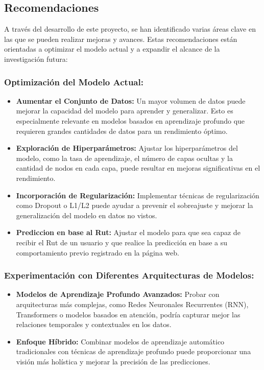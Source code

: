 \subsection{Recomendaciones}

A través del desarrollo de este proyecto, se han identificado varias áreas clave en las que se pueden realizar mejoras y avances. Estas recomendaciones están orientadas a optimizar el modelo actual y a expandir el alcance de la investigación futura:

\subsubsection{Optimización del Modelo Actual:}
\begin{itemize}
    \item \textbf{Aumentar el Conjunto de Datos:} Un mayor volumen de datos puede mejorar la capacidad del modelo para aprender y generalizar. Esto es especialmente relevante en modelos basados en aprendizaje profundo que requieren grandes cantidades de datos para un rendimiento óptimo.
    \item \textbf{Exploración de Hiperparámetros:} Ajustar los hiperparámetros del modelo, como la tasa de aprendizaje, el número de capas ocultas y la cantidad de nodos en cada capa, puede resultar en mejoras significativas en el rendimiento.
    \item \textbf{Incorporación de Regularización:} Implementar técnicas de regularización como Dropout o L1/L2 puede ayudar a prevenir el sobreajuste y mejorar la generalización del modelo en datos no vistos.
    \item \textbf{Prediccion en base al Rut:} Ajustar el modelo para que sea capaz de recibir el Rut de un usuario y que realice la predicción en base a su comportamiento previo registrado en la página web.
\end{itemize}

\subsubsection{Experimentación con Diferentes Arquitecturas de Modelos:}
\begin{itemize}
    \item \textbf{Modelos de Aprendizaje Profundo Avanzados:} Probar con arquitecturas más complejas, como Redes Neuronales Recurrentes (RNN), Transformers o modelos basados en atención, podría capturar mejor las relaciones temporales y contextuales en los datos.
    \item \textbf{Enfoque Híbrido:} Combinar modelos de aprendizaje automático tradicionales con técnicas de aprendizaje profundo puede proporcionar una visión más holística y mejorar la precisión de las predicciones.
\end{itemize}

